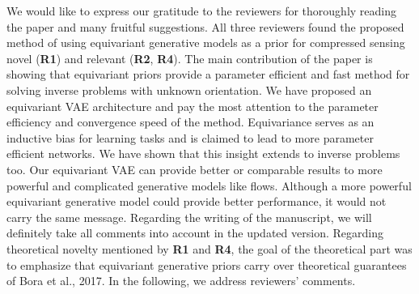 \documentclass{article}
\begin{document}


We would like to express our gratitude to the reviewers for thoroughly reading the paper and many fruitful suggestions. 
All three reviewers found the proposed method of using equivariant generative models as a prior for compressed sensing novel (\textbf{R1}) and relevant (\textbf{R2}, \textbf{R4}). 
The main contribution of the paper is showing that equivariant priors provide a parameter efficient and fast method for solving inverse problems with unknown orientation. We have proposed an equivariant VAE architecture and pay the most attention to the parameter efficiency and convergence speed of the method. Equivariance serves as an inductive bias for learning tasks and is claimed to lead to more parameter efficient networks. We have shown that this insight extends to inverse problems too. Our equivariant VAE can provide better or comparable results to more powerful and complicated generative models like flows.
Although a more powerful equivariant generative model could provide better performance, it would not carry the same message. Regarding the writing of the manuscript, we will definitely take all comments into account in the updated version.  Regarding {theoretical novelty} mentioned by \textbf{R1} and \textbf{R4}, the goal of the theoretical part was to emphasize that equivariant generative priors carry over theoretical guarantees of Bora et al., 2017. In the following, we address reviewers' comments.
\end{document}

